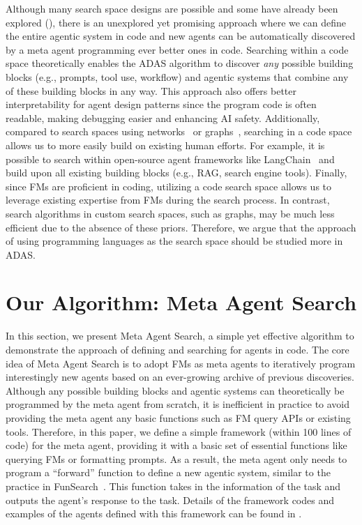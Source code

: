 \documentclass{article}
\newcommand{\problem}{ADAS\xspace}
\newcommand{\ouralgo}{Meta Agent Search\xspace}
\begin{document}
Although many search space designs are possible and some have already been explored (), there is an unexplored yet promising approach where we can define the entire agentic system in code and new agents can be automatically discovered by a meta agent programming ever better ones in code. Searching within a code space theoretically enables the \problem algorithm to discover \emph{any} possible building blocks (e.g., prompts, tool use, workflow) and agentic systems that combine any of these building blocks in any way. This approach also offers better interpretability for agent design patterns since the program code is often readable, making debugging easier and enhancing AI safety. Additionally, compared to search spaces using networks~\citep{liu2023dynamic} or graphs~\citep{zhugegptswarm}, searching in a code space allows us to more easily build on existing human efforts. For example, it is possible to search within open-source agent frameworks like LangChain~\citep{langchain} and build upon all existing building blocks (e.g., RAG, search engine tools). Finally, since FMs are proficient in coding, utilizing a code search space allows us to leverage existing expertise from FMs during the search process. In contrast, search algorithms in custom search spaces, such as graphs, may be much less efficient due to the absence of these priors.
Therefore, we argue that the approach of using programming languages as the search space should be studied more in \problem. 

\section{Our Algorithm: \ouralgo}
\label{section:method}

In this section, we present \ouralgo, a simple yet effective algorithm to demonstrate the approach of defining and searching for agents in code.
The core idea of \ouralgo is to adopt FMs as meta agents to iteratively program interestingly new agents based on an ever-growing archive of previous discoveries.
Although any possible building blocks and agentic systems can theoretically be programmed by the meta agent from scratch, it is inefficient in practice to avoid providing the meta agent any basic functions such as FM query APIs or existing tools. 
Therefore, in this paper, we define a simple framework (within 100 lines of code) for the meta agent, providing it with a basic set of essential functions like querying FMs or formatting prompts.
As a result, the meta agent only needs to program a ``forward'' function to define a new agentic system, similar to the practice in FunSearch~\citep{romera2024funSearch}.
This function takes in the information of the task and outputs the agent’s response to the task.
Details of the framework codes and examples of the agents defined with this framework can be found in .
\end{document}
